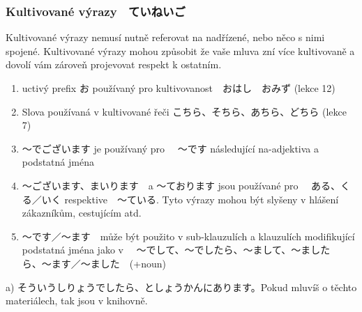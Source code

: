 \subsubsection{Kultivované výrazy　ていねいご}
Kultivované výrazy nemusí nutně referovat na nadřízené, nebo něco s nimi spojené. Kultivované výrazy mohou způsobit že vaše mluva zní více kultivovaně a dovolí vám zároveň projevovat respekt k ostatním.
\begin{enumerate}
\item uctivý prefix お používaný pro kultivovanost　おはし　おみず  (lekce 12)
\item Slova používaná v kultivované řeči こちら、そちら、あちら、どちら (lekce 7)
\item 〜でございます je používaný pro 　〜です následující na-adjektiva a podstatná jména
\item 〜ございます、まいります　a 〜ております jsou používané pro 　ある、くる／いく respektive　〜ている. Tyto výrazy mohou být slyšeny v hlášení zákazníkům, cestujícím atd.
\item 〜です／〜ます　může být použito v sub-klauzulích a klauzulích modifikující podstatná jména jako v 　〜でして、〜でしたら、〜まして、〜ましたら、〜ます／〜ました　(+noun)
\end{enumerate}
a) そういうしりょうでしたら、としょうかんにあります。Pokud mluvíš o těchto materiálech, tak jsou v knihovně.





















